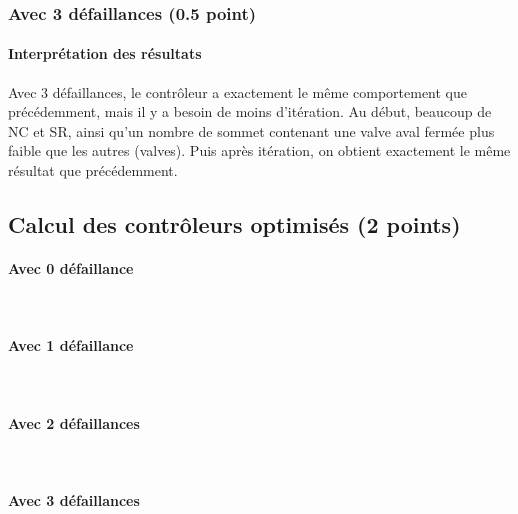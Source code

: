 \documentclass[a4paper]{book}
\begin{document}
\subsubsection{Avec 3 défaillances (0.5 point)}




%
\paragraph{Interprétation des résultats}
Avec 3 défaillances, le contrôleur a exactement le même comportement que précédemment, mais il y a besoin de moins d'itération. 
Au début, beaucoup de NC et SR, ainsi qu'un nombre de sommet contenant une valve aval fermée plus faible que les autres (valves).
Puis après itération, on obtient exactement le même résultat que précédemment.

\subsection{Calcul des contrôleurs optimisés (2 points)}
\paragraph{Avec 0 défaillance}\ \\


\paragraph{Avec 1 défaillance}\ \\


\paragraph{Avec 2 défaillances}\ \\


\paragraph{Avec 3 défaillances}\ \\

\end{document}
